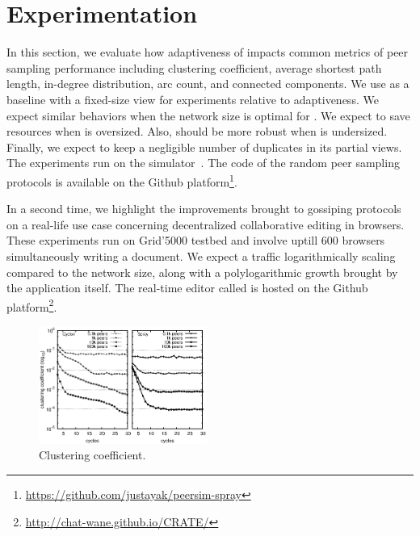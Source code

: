 \section{Experimentation}
\label{sec:experiments}

In this section, we evaluate how adaptiveness of \SPRAY impacts common metrics
of peer sampling performance including clustering coefficient, average shortest
path length, in-degree distribution, arc count, and connected components. We use
\CYCLON as a baseline with a fixed-size view for experiments relative to
adaptiveness. We expect similar behaviors when the network size is optimal for
\CYCLON. We expect \SPRAY to save resources when \CYCLON is oversized. Also,
\SPRAY should be more robust when \CYCLON is undersized. Finally, we expect
\SPRAY to keep a negligible number of duplicates in its partial views. The
experiments run on the \PEERSIM simulator~\cite{montresor2009peersim}. The code
of the random peer sampling protocols is available on the Github
platform\footnote{\url{https://github.com/justayak/peersim-spray}}.



In a second time, we highlight the improvements brought to gossiping protocols
on a real-life use case concerning decentralized collaborative editing in
browsers.  These experiments run on Grid'5000 testbed and involve uptill 600
browsers simultaneously writing a document. We expect a traffic logarithmically
scaling compared to the network size, along with a polylogarithmic growth
brought by the application itself. The real-time editor called \CRATE is hosted
on the Github platform\footnote{\url{http://chat-wane.github.io/CRATE/}}.


\begin{figure}
  \centering
  \includegraphics[width=0.49\textwidth]{img/simple.eps}
  \caption{\label{fig:avgpath}Clustering coefficient.}
\end{figure}


